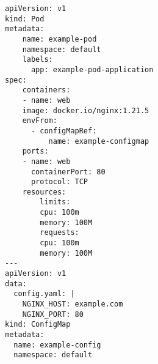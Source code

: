\documentclass[titlepage]{report}
\begin{document}
\begin{minipage}{\linewidth}
\begin{lstlisting}[caption={Embedding configuration data via a configmap in a pod},label={lst:configmap}]
apiVersion: v1
kind: Pod
metadata:
    name: example-pod
    namespace: default
    labels:
      app: example-pod-application
spec:
    containers:
    - name: web
    image: docker.io/nginx:1.21.5
    envFrom:
      - configMapRef:
          name: example-configmap
    ports:
    - name: web
      containerPort: 80
      protocol: TCP
    resources:
        limits:
        cpu: 100m
        memory: 100M
        requests:
        cpu: 100m
        memory: 100M
---
apiVersion: v1
data:
  config.yaml: |
    NGINX_HOST: example.com
    NGINX_PORT: 80
kind: ConfigMap
metadata:
  name: example-config
  namespace: default
\end{lstlisting}
\end{minipage}
\end{document}

